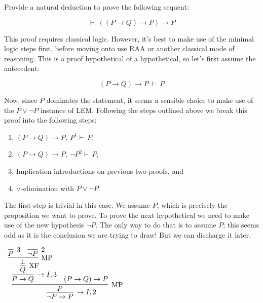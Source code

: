 \documentclass{book}
\begin{document}
    \begin{eg} 

        Provide a natural deduction to prove the following sequent: 

        $$ \vdash \ ((P \to Q) \to P) \to P$$
        
        This proof requires classical logic. However, it's best to make use of the minimal logic steps first, before moving onto use RAA or another classical mode of reasoning. This is a proof hypothetical of a hypothetical, so let's first assume the antecedent:

        $$(P \to Q) \to P \ \vdash \ P$$
        
        Now, since $P$ dominates the statement, it seems a sensible choice to make use of the $P \lor \lnot P$ instance of LEM. Following the steps outlined above we break this proof into the following steps: 

            \begin{enumerate}
                \item $(P \to Q) \to P, \ P^{1} \vdash \ P$,
                \item $(P \to Q) \to P, \ \lnot P^{2} \vdash \ P$,
                \item Implication introductions on previous two proofs, and
                \item $\lor$-elimination with $P \lor \lnot P$. 
            \end{enumerate}
        
        The first step is trivial in this case. We assume $P$, which is precisely the proposition we want to prove. To prove the next hypothetical we need to make use of the new hypothesis $\lnot P$. The only way to do that is to assume $P$; this seems odd as it is the conclusion we are trying to draw! But we can discharge it later. 
        
        \begin{center}
            $\begin{array}{c}
                \infer[\to I,2]{\lnot P \to P}
                    {\infer[\MP]{P}
                        {\infer[\to I,3]{P \to Q}
                            {\infer[\XF]{Q}
                                {\infer[\MP]{\bot}
                                    {\infer[3]{P}{}
                                    &
                                    \infer[2]{\lnot P}{}}}}
                        &
                        (P \to Q) \to P}}
            \end{array}$
        \end{center}
        

\end{eg}
\end{document}
